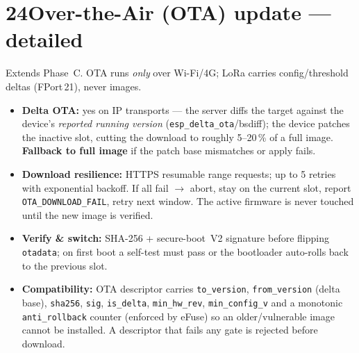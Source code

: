 \section*{24\quad Over-the-Air (OTA) update — detailed}
Extends Phase~C. OTA runs \emph{only} over Wi-Fi/4G; LoRa carries config/threshold deltas (FPort\,21),
never images.
\begin{itemize}[leftmargin=1.4em,itemsep=1pt]
  \item \textbf{Delta OTA:} yes on IP transports — the server diffs the target against the device's
        \emph{reported running version} (\texttt{esp\_delta\_ota}/bsdiff); the device patches the
        inactive slot, cutting the download to roughly 5--20\,\% of a full image. \textbf{Fallback to
        full image} if the patch base mismatches or apply fails.
  \item \textbf{Download resilience:} HTTPS resumable range requests; up to 5 retries with exponential
        backoff. If all fail $\to$ abort, stay on the current slot, report \texttt{OTA\_DOWNLOAD\_FAIL},
        retry next window. The active firmware is never touched until the new image is verified.
  \item \textbf{Verify \& switch:} SHA-256 + secure-boot~V2 signature before flipping \texttt{otadata};
        on first boot a self-test must pass or the bootloader auto-rolls back to the previous slot.
  \item \textbf{Compatibility:} OTA descriptor carries \texttt{to\_version}, \texttt{from\_version}
        (delta base), \texttt{sha256}, \texttt{sig}, \texttt{is\_delta}, \texttt{min\_hw\_rev},
        \texttt{min\_config\_v} and a monotonic \texttt{anti\_rollback} counter (enforced by eFuse) so
        an older/vulnerable image cannot be installed. A descriptor that fails any gate is rejected
        before download.
\end{itemize}

